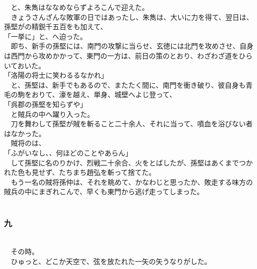 \documentclass[
  paper=a5,
  fontsize=10pt,
  jafontsize=9.5pt,
  tate,                  %
  open_bracket_pos=nibu, %
]{jlreq}
\begin{document}
　と、朱雋はななめならずよろこんで迎えた。\\


　きょうさんざんな敗軍の日ではあったし、朱雋は、大いに力を得て、翌日は、孫堅がの精鋭千五百をも加えて、\\


「一挙に」と、へ迫った。\\


　即ち、新手の孫堅には、南門の攻撃に当らせ、玄徳には北門を攻めさせ、自身は西門から攻めかかって、東門の一方は、前日の策のとおり、わざわざ道をひらいておいた。\\


「洛陽の将士に笑わるるなかれ」\\


　と、孫堅は、新手でもあるので、またたく間に、南門を衝き破り、彼自身も青毛の駒をおりて、濠を越え、単身、城壁へよじ登って、\\


「呉郡の孫堅を知らずや」\\


　と賊兵の中へ躍り入った。\\


　刀を舞わして孫堅が賊を斬ること二十余人、それに当って、噴血を浴びない者はなかった。\\


　賊将のは、\\


「ふがいなし、、何ほどのことやあらん」\\


　して孫堅に名のりかけ、烈戦二十余合、火をとばしたが、孫堅はあくまでつかれた色も見せず、たちまち趙弘を斬って捨てた。\\


　もう一名の賊将孫仲は、それを眺めて、かなわじと思ったか、敗走する味方の賊兵の中にまぎれこんで、早くも東門から逃げ走ってしまった。\\

\\

\subsubsection{九}

\\


　その時。\\


　ひゅっと、どこか天空で、弦を放たれた一矢の矢うなりがした。\\
\end{document}
